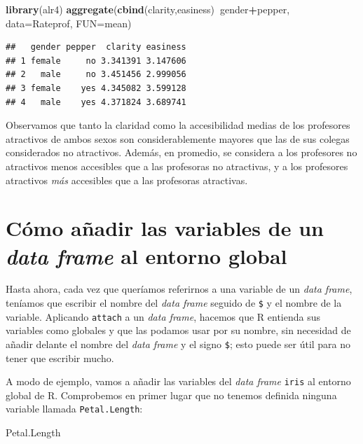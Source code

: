 \documentclass[]{book}
\newenvironment{Shaded}{\begin{snugshade}}{\end{snugshade}}
\newcommand{\DataTypeTok}[1]{\textcolor[rgb]{0.13,0.29,0.53}{#1}}
\newcommand{\KeywordTok}[1]{\textcolor[rgb]{0.13,0.29,0.53}{\textbf{#1}}}
\newcommand{\NormalTok}[1]{#1}
\newcommand{\OperatorTok}[1]{\textcolor[rgb]{0.81,0.36,0.00}{\textbf{#1}}}
\theoremstyle{definition}
\theoremstyle{definition}
\theoremstyle{definition}
\theoremstyle{remark}
\begin{document}
\begin{Shaded}
\begin{Highlighting}[]
\KeywordTok{library}\NormalTok{(alr4)}
\KeywordTok{aggregate}\NormalTok{(}\KeywordTok{cbind}\NormalTok{(clarity,easiness)}\OperatorTok{~}\NormalTok{gender}\OperatorTok{+}\NormalTok{pepper, }\DataTypeTok{data=}\NormalTok{Rateprof, }\DataTypeTok{FUN=}\NormalTok{mean)}
\end{Highlighting}
\end{Shaded}

\begin{verbatim}
##   gender pepper  clarity easiness
## 1 female     no 3.341391 3.147606
## 2   male     no 3.451456 2.999056
## 3 female    yes 4.345082 3.599128
## 4   male    yes 4.371824 3.689741
\end{verbatim}

Observamos que tanto la claridad como la accesibilidad medias de los profesores atractivos de ambos sexos son considerablemente mayores que las de sus colegas considerados no atractivos. Además, en promedio, se considera a los profesores no atractivos menos accesibles que a las profesoras no atractivas, y a los profesores atractivos \emph{más} accesibles que a las profesoras atractivas.

\hypertarget{sub:attach}{%
\section{\texorpdfstring{Cómo añadir las variables de un \emph{data frame} al entorno global}{Cómo añadir las variables de un data frame al entorno global}}\label{sub:attach}}

Hasta ahora, cada vez que queríamos referirnos a una variable de un \emph{data frame}, teníamos que escribir el nombre del \emph{data frame} seguido de \texttt{\$} y el nombre de la variable. Aplicando \texttt{attach} a un \emph{data frame}, hacemos que R entienda sus variables como globales y que las podamos usar por su nombre, sin necesidad de añadir delante el nombre del \emph{data frame} y el signo \texttt{\$}; esto puede ser útil para no tener que escribir mucho.

A modo de ejemplo, vamos a añadir las variables del \emph{data frame} \texttt{iris} al entorno global de R. Comprobemos en primer lugar que no tenemos definida ninguna variable llamada \texttt{Petal.Length}:

\begin{Shaded}
\begin{Highlighting}[]
\NormalTok{Petal.Length}
\end{Highlighting}
\end{Shaded}
\end{document}
